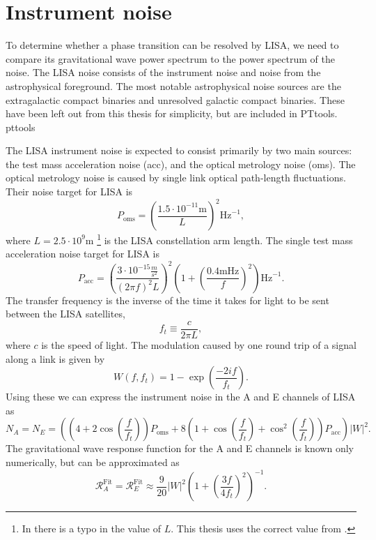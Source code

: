 \section{Instrument noise}
\label{noise}
To determine whether a phase transition can be resolved by LISA,
we need to compare its gravitational wave power spectrum to the power spectrum of the noise.
The LISA noise consists of the instrument noise and noise from the astrophysical foreground.
The most notable astrophysical noise sources are the extragalactic compact binaries and unresolved galactic compact binaries.
These have been left out from this thesis for simplicity, but are included in PTtools.
\cite{gowling_lisa_2021}{pttools}

The LISA instrument noise is expected to consist primarily by two main sources: the test mass acceleration noise (acc), and the optical metrology noise (oms).
The optical metrology noise is caused by single link optical path-length fluctuations.
Their noise target for LISA is
\cites[eq. 3.2]{gowling_lisa_2021}[eq. 54]{smith_lisa_2019}
\begin{equation}
P_\text{oms} = \left( \frac{1.5 \cdot 10^{-11} \text{m}}{L} \right)^2 \text{Hz}^{-1},
\end{equation}
where $L = 2.5 \cdot 10^9 \text{m}$%
\footnote{In \cite[p. 12]{gowling_lisa_2021} there is a typo in the value of $L$. This thesis uses the correct value from \cite{smith_lisa_2019}.}
is the LISA constellation arm length.
The single test mass acceleration noise target for LISA is
\cites[eq. 3.3]{gowling_lisa_2021}[eq. 52-53]{smith_lisa_2019}
\begin{equation}
P_\text{acc} = \left( \frac{3 \cdot 10^{-15} \frac{m}{s^2}}{(2\pi f)^2 L} \right)^2 \left( 1 + \left( \frac{0.4 \text{mHz}}{f} \right)^2 \right) \text{Hz}^{-1}.
\end{equation}
The transfer frequency is the inverse of the time it takes for light to be sent between the LISA satellites,
\begin{equation}
f_t \equiv \frac{c}{2 \pi L},
\end{equation}
where $c$ is the speed of light.
The modulation caused by one round trip of a signal along a link is given by
\cite[p. 12]{gowling_lisa_2021}
\begin{equation}
W(f,f_t) = 1 - \exp \left( \frac{-2if}{f_t} \right).
\end{equation}
Using these we can express the instrument noise in the A and E channels of LISA as
\cites[eq. 3.4]{gowling_lisa_2021}[eq. 57]{smith_lisa_2019}
\begin{equation}
N_A = N_E = \left(
\left(4 + 2 \cos \left( \frac{f}{f_t} \right) \right) P_\text{oms} +
8 \left( 1 + \cos \left( \frac{f}{f_t} \right) + \cos^2 \left( \frac{f}{f_t} \right) \right) P_\text{acc}
\right) |W|^2.
\end{equation}
The gravitational wave response function for the A and E channels is known only numerically, but can be approximated as
\cites[eq. 3.6]{gowling_lisa_2021}[eq. 32]{smith_lisa_2019}
\begin{equation}
\mathcal{R}_A^\text{Fit} = \mathcal{R}_E^\text{Fit} \approx \frac{9}{20} |W|^2 \left( 1 + \left( \frac{3f}{4f_t} \right)^2 \right)^{-1}.
\end{equation}

